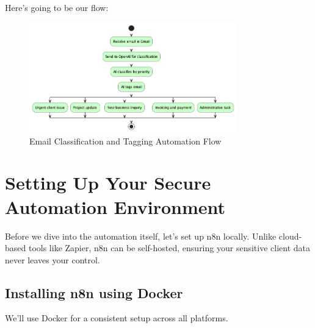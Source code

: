 Here's going to be our flow:

\begin{figure}
    \centering
    \includegraphics[width=0.8\textwidth]{./figures/01-n8n-flow}
        \caption{Email Classification and Tagging Automation Flow}
    \label{fig:01_email_automation}
\end{figure}


\section{Setting Up Your Secure Automation Environment}

Before we dive into the automation itself, let's set up n8n locally. Unlike cloud-based tools like Zapier, n8n can be self-hosted, ensuring your sensitive client data never leaves your control.

\subsection{Installing n8n using Docker}

We'll use Docker for a consistent setup across all platforms.

